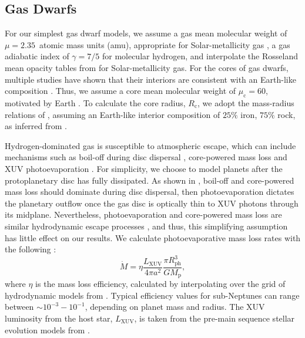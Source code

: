 \documentclass[fleqn,usenatbib]{mnras}
\begin{document}
\subsection{Gas Dwarfs} \label{sec:GasDwarfParams}

For our simplest gas dwarf models, we assume a gas mean molecular weight of $\mu = 2.35$~atomic mass units (amu), appropriate for Solar-metallicity gas \citep[e.g.][]{Anders1989}, a gas adiabatic index of $\gamma = 7/5$ for molecular hydrogen, and interpolate the Rosseland mean opacity tables from \citet{Kempton2023} for Solar-metallicity gas. For the cores of gas dwarfs, multiple studies have shown that their interiors are consistent with an Earth-like composition \citep[e.g.][]{Owen2017,Gupta2020,Rogers2021,Rogers2023}. Thus, we assume a core mean molecular weight of $\mu_\text{c} = 60$, motivated by Earth \citep{Szurgot2015}. To calculate the core radius, $R_\text{c}$, we adopt the mass-radius relations of \citet{Fortney2007}, assuming an Earth-like interior composition of $25\%$ iron, $75\%$ rock, as inferred from \citet{Rogers2021,Rogers2023}.

Hydrogen-dominated gas is susceptible to atmospheric escape, which can include mechanisms such as boil-off during disc dispersal \citep{Owen2016,Ginzburg2016,Rogers2024a}, core-powered mass loss \citep[e.g.][]{Ginzburg2018,Gupta2019,Misener2024} and XUV photoevaporation \citep[e.g.][]{OwenJackson2012,Kubyshkina2022,Schulik2022,Caldiroli2022}. For simplicity, we choose to model planets after the protoplanetary disc has fully dissipated. As shown in \citet{Rogers2024a}, boil-off and core-powered mass loss should dominate during disc dispersal, then photoevaporation dictates the planetary outflow once the gas disc is optically thin to XUV photons through its midplane. Nevertheless, photoevaporation and core-powered mass loss are similar hydrodynamic escape processes \citep{Owen2024}, and thus, this simplifying assumption has little effect on our results. We calculate photoevaporative mass loss rates with the following \citep{Lecavelier2007,Erkaev2007}:
\begin{equation} \label{eq:Mdot}
    \dot{M} = \eta \frac{L_\text{XUV}}{4\pi a^2} \frac{\pi R_\text{ph}^3}{GM_\text{p}},
\end{equation}
where $\eta$ is the mass loss efficiency, calculated by interpolating over the grid of hydrodynamic models from \citet{OwenJackson2012}. Typical efficiency values for sub-Neptunes can range between $\sim 10^{-3} - 10^{-1}$, depending on planet mass and radius. The XUV luminosity from the host star, $L_\text{XUV}$, is taken from the pre-main sequence stellar evolution models from \citet{Johnstone2021}.
\end{document}
